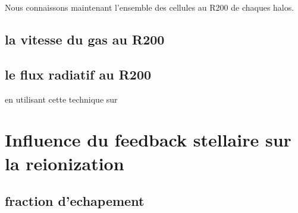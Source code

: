 Nous connaissons maintenant l'ensemble des cellules au R200 de chaques halos.

\subsection{la vitesse du gas au R200}



\subsection{le flux radiatif au R200}
en utilisant cette technique sur 


\section{Influence du feedback stellaire sur la reionization}







\subsection{fraction d'echapement}

